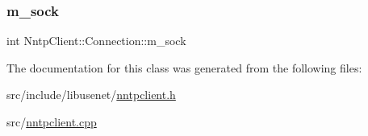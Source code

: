 \hypertarget{class_nntp_client_1_1_connection_a617eb80b423c28d3f7feaff839787e3e}{}\label{class_nntp_client_1_1_connection_a617eb80b423c28d3f7feaff839787e3e} 
\subsubsection{\texorpdfstring{m\+\_\+sock}{m\_sock}}
{\footnotesize\ttfamily int Nntp\+Client\+::\+Connection\+::m\+\_\+sock\hspace{0.3cm}{\ttfamily [protected]}}



The documentation for this class was generated from the following files\+:\begin{DoxyCompactItemize}
\item 
src/include/libusenet/\hyperlink{nntpclient_8h}{nntpclient.\+h}\item 
src/\hyperlink{nntpclient_8cpp}{nntpclient.\+cpp}\end{DoxyCompactItemize}
